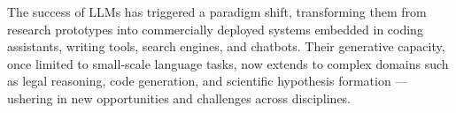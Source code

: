 The success of LLMs has triggered a paradigm shift, transforming them from research prototypes into commercially deployed systems embedded in coding assistants, writing tools, search engines, and chatbots. Their generative capacity, once limited to small-scale language tasks, now extends to complex domains such as legal reasoning, code generation, and scientific hypothesis formation — ushering in new opportunities and challenges across disciplines.




